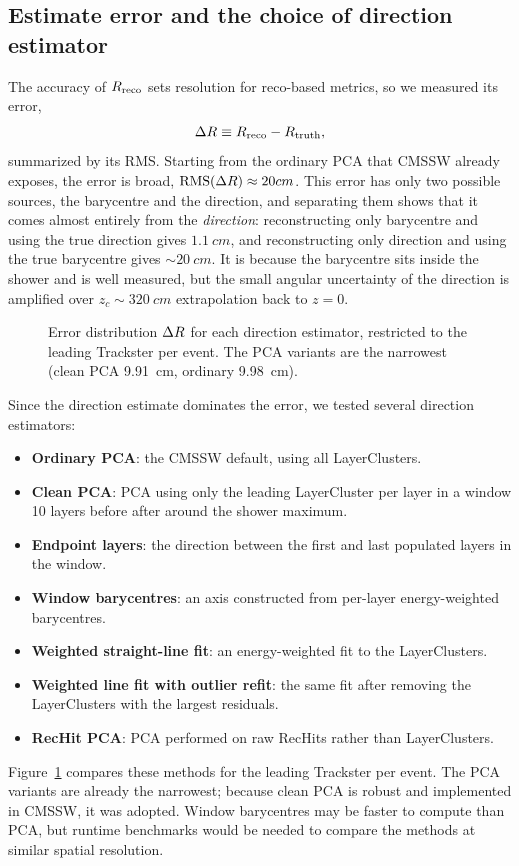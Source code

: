 \subsection{Estimate error and the choice of direction estimator}

The accuracy of $R_{\text{reco}}$ sets resolution for reco-based metrics, so we measured its error,
\begin{equation}
  \Delta R \equiv R_{\text{reco}} - R_{\text{truth}},
  \label{eq:deltaR}
\end{equation}
summarized by its RMS. Starting from the ordinary PCA that CMSSW
already exposes, the error is broad,
$\text{RMS}(\Delta R)\approx20 cm$. This error has only two possible
sources, the barycentre and the direction, and separating them shows that it
comes almost entirely from the \emph{direction}: reconstructing only
barycentre and using the true direction gives $\SI{1.1}{cm}$, and
reconstructing only direction and using the true barycentre gives $\sim\SI{20}{cm}$. It is because the barycentre sits inside the
shower and is well measured, but the small angular uncertainty of the direction is
amplified over $z_c\sim\SI{320}{cm}$ extrapolation back to $z=0$.

\begin{figure}[!tp]
  \centering
  \caption{Error distribution $\Delta R$ for each direction estimator,
  restricted to the leading Trackster per event. The PCA
  variants are the narrowest (clean PCA \SI{9.91}{cm}, ordinary \SI{9.98}{cm}).}
  \label{fig:methods}
\end{figure}

Since the direction estimate dominates the error, we tested several direction
estimators:
\begin{itemize}
  \item \textbf{Ordinary PCA}: the CMSSW default, using all LayerClusters.
  \item \textbf{Clean PCA}: PCA using only the leading
  LayerCluster per layer in a window 10 layers before after around the shower maximum.
  \item \textbf{Endpoint layers}: the direction between the first and last
  populated layers in the window.
  \item \textbf{Window barycentres}: an axis constructed from per-layer
  energy-weighted barycentres.
  \item \textbf{Weighted straight-line fit}: an energy-weighted fit to the
  LayerClusters.
  \item \textbf{Weighted line fit with outlier refit}: the same fit after
  removing the LayerClusters with the largest residuals.
  \item \textbf{RecHit PCA}: PCA performed on raw RecHits rather than
  LayerClusters.
\end{itemize}
Figure~\ref{fig:methods} compares these methods for the leading Trackster per
event. The PCA variants are already the narrowest; because clean PCA is robust
and implemented in CMSSW, it was adopted.
Window barycentres may be faster to compute than PCA, but runtime benchmarks
would be needed to compare the methods at similar spatial resolution.

